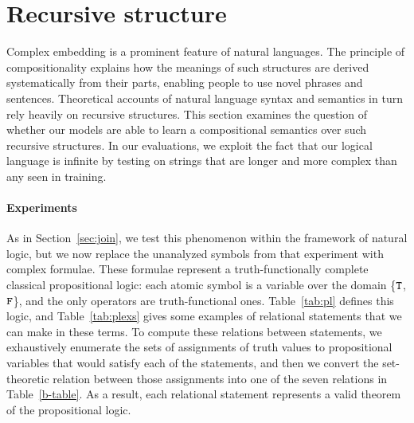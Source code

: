 \section{Recursive structure}\label{sec:recursion}

Complex embedding is a prominent feature of natural languages. 
The principle of compositionality explains how the meanings of 
such structures are derived systematically from their parts,
 enabling people to use novel phrases and sentences.
Theoretical accounts of natural language syntax and semantics
in turn rely heavily on recursive structures. This section examines the 
question of whether our models are able to learn a 
compositional semantics over such recursive structures.
In our evaluations, we exploit the fact that our logical language
is infinite by testing on strings that are longer and more complex
than any seen in training.


\paragraph{Experiments}
As in Section~\ref{sec:join}, we test this phenomenon within the
framework of natural logic, but we now replace the unanalyzed symbols
from that experiment with complex formulae. These formulae
represent a truth-functionally complete classical propositional logic:
each atomic symbol is a variable over the domain \{$\texttt{T}$, $\texttt{F}$\}, and the only
operators are truth-functional ones.  Table~\ref{tab:pl} defines this
logic, and Table~\ref{tab:plexs} gives some examples of relational
statements that we can make in these terms. To compute these relations
between statements, we exhaustively enumerate the sets of assignments
of truth values to propositional variables that would satisfy each of
the statements, and then we convert the set-theoretic relation between
those assignments into one of the seven relations in
Table~\ref{b-table}. As a result, each relational statement represents
a valid theorem of the propositional logic.

